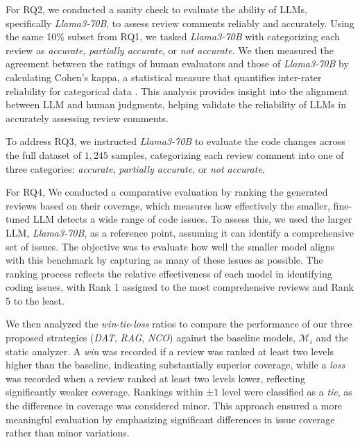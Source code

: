 For RQ2, we conducted a sanity check to evaluate the ability of LLMs, specifically \emph{Llama3-70B}, to assess review comments reliably and accurately. Using the same 10\% subset from RQ1, we tasked \emph{Llama3-70B} with categorizing each review as \emph{accurate}, \emph{partially accurate}, or \emph{not accurate}. We then measured the agreement between the ratings of human evaluators and those of \emph{Llama3-70B} by calculating Cohen’s kappa, a statistical measure that quantifies inter-rater reliability for categorical data \cite{thakur2024judging, mchugh2012interrater}. This analysis provides insight into the alignment between LLM and human judgments, helping validate the reliability of LLMs in accurately assessing review comments.

To address RQ3, we instructed \emph{Llama3-70B} to evaluate the code changes across the full dataset of $1,245$ samples, categorizing each review comment into one of three categories: \emph{accurate}, \emph{partially accurate}, or \emph{not accurate}.

For RQ4, We conducted a comparative evaluation by ranking the generated reviews based on their coverage, which measures how effectively the smaller, fine-tuned LLM detects a wide range of code issues. To assess this, we used the larger LLM, \emph{Llama3-70B}, as a reference point, assuming it can identify a comprehensive set of issues. The objective was to evaluate how well the smaller model aligns with this benchmark by capturing as many of these issues as possible. The ranking process reflects the relative effectiveness of each model in identifying coding issues, with Rank 1 assigned to the most comprehensive reviews and Rank 5 to the least.



We then analyzed the \emph{win}-\emph{tie}-\emph{loss} ratios to compare the performance of our three proposed strategies (\emph{DAT}, \emph{RAG}, \emph{NCO}) against the baseline models, $\mathcal{M}_i$ and the static analyzer. A \emph{win} was recorded if a review was ranked at least two levels higher than the baseline, indicating substantially superior coverage, while a \emph{loss} was recorded when a review ranked at least two levels lower, reflecting significantly weaker coverage. Rankings within ±$1$ level were classified as a \emph{tie}, as the difference in coverage was considered minor. This approach ensured a more meaningful evaluation by emphasizing significant differences in issue coverage rather than minor variations. 



